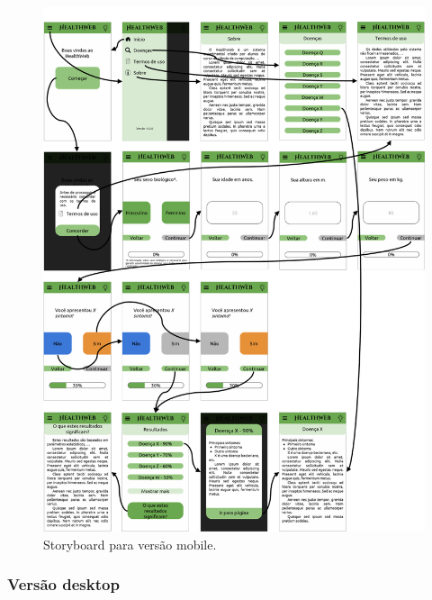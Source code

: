 \begin{figure}[htbp]
	\centering
	\includegraphics[width=\linewidth]{figure/prototype/mobile/storyboard.png}
	\caption{Storyboard para versão mobile.}
	\label{fig:mobile:story}
\end{figure}

\subsubsection{Versão desktop}

